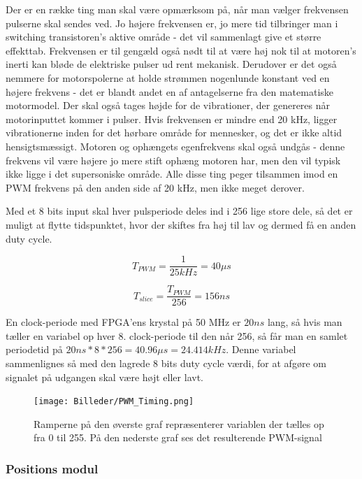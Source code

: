 Der er en række ting man skal være opmærksom på, når man vælger frekvensen pulserne skal sendes ved. Jo højere frekvensen er, jo mere tid tilbringer man i switching transistoren's aktive område - det vil sammenlagt give et større effekttab. Frekvensen er til gengæld også nødt til at være høj nok til at motoren's inerti kan bløde de elektriske pulser ud rent mekanisk. Derudover er det også nemmere for motorspolerne at holde strømmen nogenlunde konstant ved en højere frekvens - det er blandt andet en af antagelserne fra den matematiske motormodel. Der skal også tages højde for de vibrationer, der genereres når motorinputtet kommer i pulser. Hvis frekvensen er mindre end 20 kHz, ligger vibrationerne inden for det hørbare område for mennesker, og det er ikke altid hensigtsmæssigt. Motoren og ophængets egenfrekvens skal også undgås - denne frekvens vil være højere jo mere stift ophæng motoren har, men den vil typisk ikke ligge i det supersoniske område. Alle disse ting peger tilsammen imod en PWM frekvens på den anden side af 20 kHz, men ikke meget derover. 

Med et 8 bits input skal hver pulsperiode deles ind i 256 lige store dele, så det er muligt at flytte tidspunktet, hvor der skiftes fra høj til lav og dermed få en anden duty cycle. 

\begin{equation}
T_{PWM}=\dfrac{1}{25 kHz} = 40 \mu s
\end{equation}

\begin{equation}
T_{slice}=\dfrac{T_{PWM}}{256}=156ns
\end{equation}

En clock-periode med FPGA'ens krystal på 50 MHz er $20ns$ lang, så hvis man tæller en variabel op hver 8. clock-periode til den når 256, så får man en samlet periodetid på $20ns*8*256=40.96 \mu s=24.414kHz$. Denne variabel sammenlignes så med den lagrede 8 bits duty cycle værdi, for at afgøre om signalet på udgangen skal være højt eller lavt.

\begin{figure}[h]
	\begin{center}
		\texttt{[image: Billeder/PWM\_Timing.png]}
	\end{center}
\label{fig:PWM_timing}
\caption{Ramperne på den øverste graf repræsenterer variablen der tælles op fra 0 til 255. På den nederste graf ses det resulterende PWM-signal}
\end{figure}

\subsubsection{Positions modul}

